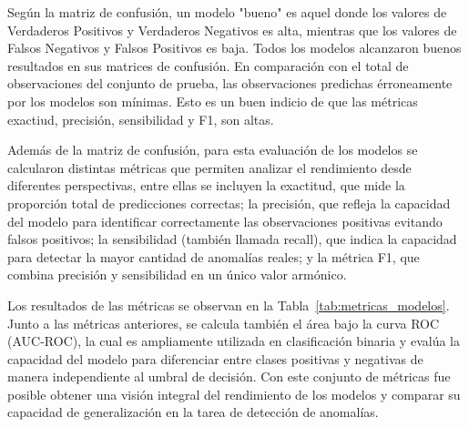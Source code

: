 \documentclass[11pt,a4paper,spanish]{book}
\numberwithin{equation}{chapter}
\numberwithin{figure}{chapter}
\begin{document}
Según la matriz de confusión, un modelo "bueno" es aquel donde los valores de Verdaderos Positivos
y Verdaderos Negativos es alta, mientras que los valores de Falsos Negativos y Falsos Positivos es
baja. 
Todos los modelos alcanzaron buenos resultados en sus matrices de confusión. En comparación con el
total de observaciones del conjunto de prueba, las observaciones predichas érroneamente por los
modelos son mínimas. Esto es un buen indicio de que las métricas exactiud, precisión, sensibilidad
y F1, son altas. 


Además de la matriz de confusión, para esta evaluación de los modelos se calcularon 
distintas métricas que permiten analizar el rendimiento desde diferentes perspectivas,
entre ellas se incluyen la exactitud, que mide la proporción total de 
predicciones correctas; la precisión, que refleja la capacidad del modelo para 
identificar correctamente las observaciones positivas evitando falsos positivos; 
la sensibilidad (también llamada recall), que indica la capacidad para detectar la 
mayor cantidad de anomalías reales; y la métrica F1, que combina precisión y 
sensibilidad en un único valor armónico.


Los resultados de las métricas se observan en  
la Tabla~\ref{tab:metricas_modelos}. 
Junto a las métricas anteriores, se calcula también el área bajo la curva ROC (AUC-ROC), 
la cual es  
ampliamente utilizada en clasificación binaria y evalúa la capacidad del modelo para 
diferenciar entre clases positivas y negativas de manera independiente al umbral de 
decisión. Con este conjunto de métricas fue posible obtener una visión integral del 
rendimiento de los modelos y comparar su capacidad de generalización en la tarea de 
detección de anomalías. 
\end{document}
